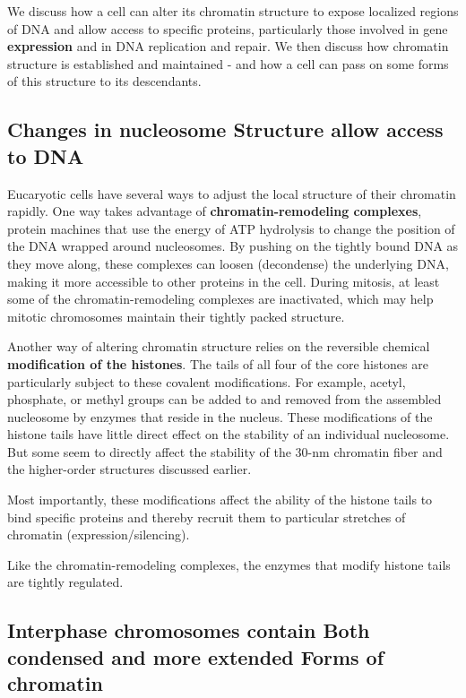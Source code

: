 We discuss how a cell can alter its chromatin structure to
expose localized regions of DNA and allow access to specific proteins,
particularly those involved in gene \textbf{expression} and in DNA replication
and repair. We then discuss how chromatin structure is established and
maintained - and how a cell can pass on some forms of this structure
to its descendants.

\subsection{Changes in nucleosome Structure allow access to DNA}

Eucaryotic cells have several ways to adjust the local structure of their
chromatin rapidly. One way takes advantage of \textbf{chromatin-remodeling
complexes}, protein machines that use the energy of ATP hydrolysis to
change the position of the DNA wrapped around nucleosomes. By pushing
on the tightly bound DNA as they move along, these complexes can
loosen (decondense) the underlying DNA, making it more accessible to
other proteins in the cell. During mitosis, at least some of
the chromatin-remodeling complexes are inactivated, which may help
mitotic chromosomes maintain their tightly packed structure.

Another way of altering chromatin structure relies on the reversible chemical
\textbf{modification of the histones}. The tails of all four of the core histones
are particularly subject to these covalent modifications. For example,
acetyl, phosphate, or methyl groups can be added to and removed from
the assembled nucleosome by enzymes that reside in the nucleus. These
modifications of the histone tails have little direct effect on the stability of
an individual nucleosome. But some seem to directly affect the stability
of the 30-nm chromatin fiber and the higher-order structures discussed
earlier.

Most importantly, these modifications affect the ability of the histone tails
to bind specific proteins and thereby recruit them to particular stretches
of chromatin (expression/silencing).

Like the chromatin-remodeling complexes, the enzymes that modify histone
tails are tightly regulated.

\subsection{Interphase chromosomes contain Both condensed and more extended Forms of chromatin}

